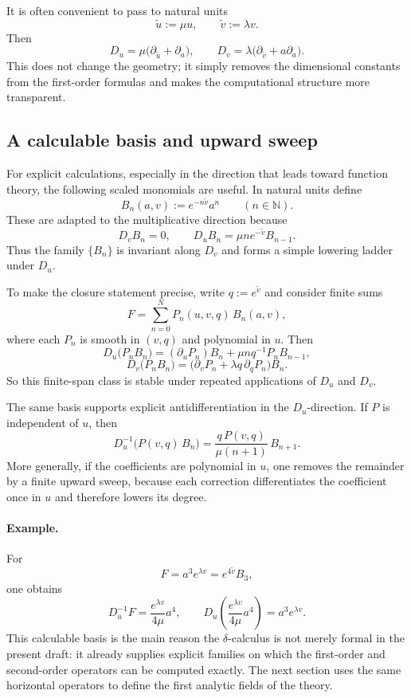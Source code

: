 It is often convenient to pass to natural units
\[
\tilde u:=\mu u,
\qquad
\tilde v:=\lambda v.
\]
Then
\[
D_u=\mu\bigl(\partial_{\tilde u}+\partial_a\bigr),
\qquad
D_v=\lambda\bigl(\partial_{\tilde v}+a\partial_a\bigr).
\]
This does not change the geometry; it simply removes the dimensional constants from the first-order formulas and makes the computational structure more transparent.

\subsection{A calculable basis and upward sweep}

For explicit calculations, especially in the direction that leads toward function theory, the following scaled monomials are useful. In natural units define
\[
B_n(a,v):=e^{-n\tilde v}a^n
\qquad (n\in\mathbb{N}).
\]
These are adapted to the multiplicative direction because
\[
D_vB_n=0,
\qquad
D_uB_n=\mu n e^{-\tilde v}B_{n-1}.
\]
Thus the family $\{B_n\}$ is invariant along $D_v$ and forms a simple lowering ladder under $D_u$.

To make the closure statement precise, write $q:=e^{\tilde v}$ and consider finite sums
\[
F=\sum_{n=0}^N P_n(u,v,q)\,B_n(a,v),
\]
where each $P_n$ is smooth in $(v,q)$ and polynomial in $u$. Then
\[
D_u\bigl(P_nB_n\bigr)=(\partial_uP_n)B_n+\mu n q^{-1}P_nB_{n-1},
\]
\[
D_v\bigl(P_nB_n\bigr)=\bigl(\partial_vP_n+\lambda q\,\partial_qP_n\bigr)B_n.
\]
So this finite-span class is stable under repeated applications of $D_u$ and $D_v$.

The same basis supports explicit antidifferentiation in the $D_u$-direction. If $P$ is independent of $u$, then
\[
D_u^{-1}\!\bigl(P(v,q)\,B_n\bigr)
=\frac{q\,P(v,q)}{\mu(n+1)}\,B_{n+1}.
\]
More generally, if the coefficients are polynomial in $u$, one removes the remainder by a finite upward sweep, because each correction differentiates the coefficient once in $u$ and therefore lowers its degree.

\paragraph{Example.}
For
\[
F=a^3e^{\lambda v}=e^{4\tilde v}B_3,
\]
one obtains
\[
D_u^{-1}F=\frac{e^{\lambda v}}{4\mu}a^4,
\qquad
D_u\!\left(\frac{e^{\lambda v}}{4\mu}a^4\right)=a^3e^{\lambda v}.
\]
This calculable basis is the main reason the $\delta$-calculus is not merely formal in the present draft: it already supplies explicit families on which the first-order and second-order operators can be computed exactly. The next section uses the same horizontal operators to define the first analytic fields of the theory.
